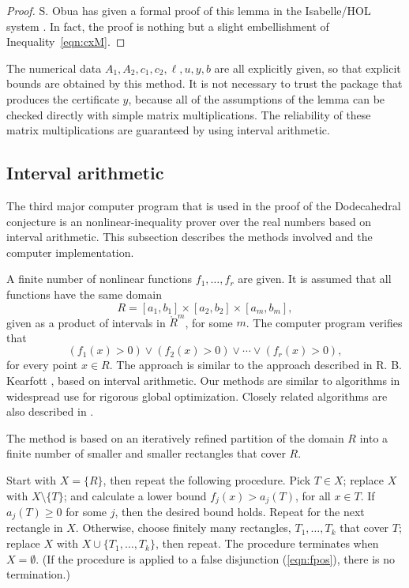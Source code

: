 \documentclass{article} %
\begin{document}
\begin{proof} S. Obua has given a formal proof of this lemma in the
Isabelle/HOL system \cite[3.7.2]{Obua:2008:Thesis}. In fact, the proof
is nothing but a slight embellishment of Inequality~\ref{eqn:cxM}.
\end{proof}

The numerical data $A_1,A_2,c_1,c_2,\ell,u,y,b$ are all explicitly given,
so that explicit bounds are obtained by this
method.  It is not necessary to trust the package
that produces the certificate $y$, because
all of the assumptions of the lemma can be checked directly with
simple matrix multiplications.  The reliability of these matrix
multiplications are guaranteed by using interval arithmetic.

\subsection{Interval arithmetic}

The third major computer program that is used in the proof of
the Dodecahedral conjecture is an nonlinear-inequality prover
over the real numbers based on interval arithmetic.  
This subsection describes the
methods involved and the computer implementation.

A finite number of nonlinear functions $f_1,\ldots,f_r$ are given. It
is assumed that all functions have the same domain
$$R= [a_1,b_1] \times [a_2,b_2] \times [a_m,b_m],$$
given as a product of intervals in $\ring{R}^m$, for some $m$. The
computer program verifies that
\begin{equation}\label{eqn:fpos}
  (f_1(x) >0) \lor (f_2(x) >0) \lor \cdots \lor (f_r(x) >0),
\end{equation}
for every point $x\in R$. The approach is similar to the approach
described in R. B. Kearfott \cite{Kearfott:1996:Interval}, based on interval
arithmetic. Our methods are similar to algorithms in widespread use
for rigorous global optimization. Closely related algorithms are also
described in \cite{Zumkeller:2006:IJCAR}.

The method is based on an iteratively refined 
partition of the domain  $R$
into a finite number of smaller and smaller rectangles that cover $R$.

Start with $X=\{R\}$,  then repeat the following procedure.
Pick $T\in X$; replace $X$ with $X\setminus\{T\}$; and
calculate a lower bound $f_j(x) > a_j(T)$, 
for all $x\in T$.  If $a_j(T)\ge 0$ for some $j$, then
the desired bound holds.  Repeat for the next rectangle in $X$.
Otherwise, choose finitely many rectangles, $T_1,\ldots,T_k$ that cover $T$;
replace $X$ with $X\cup\{T_1,\ldots,T_k\}$, then repeat.
The procedure terminates when $X=\emptyset$.  (If the procedure
is applied to a false disjunction (\ref{eqn:fpos}), there is no
termination.)
\end{document}
